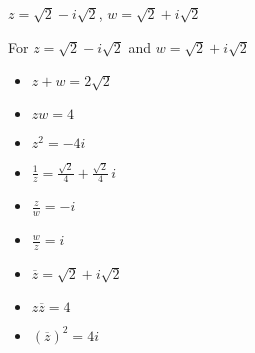 {$z = \sqrt{2} - i\sqrt{2}$, $w = \sqrt{2} + i\sqrt{2}$}
{For  $z = \sqrt{2} - i\sqrt{2}$ and $w = \sqrt{2} + i\sqrt{2}$

\begin{itemize}

\item $z+w = 2\sqrt{2}$

\item $zw = 4$

\item $z^2 = -4i$

\item $\frac{1}{z} = \frac{\sqrt{2}}{4} + \frac{\sqrt{2}}{4} \,i$

\item $\frac{z}{w} = -i$

\item $\frac{w}{z} = i$

\item $\overline{z} = \sqrt{2}+i\sqrt{2}$

\item $z\overline{z} = 4$

\item $(\overline{z})^2 = 4i$

\end{itemize}
}
